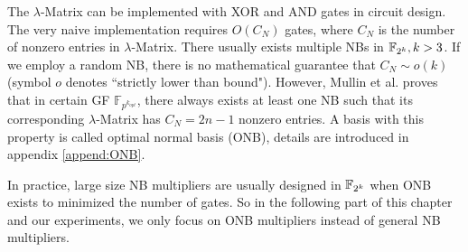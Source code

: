 The $\lambda$-Matrix can be implemented with XOR and AND gates in circuit design.
The very naive implementation requires $O(C_N)$ gates, where $C_N$ is the number of
nonzero entries in $\lambda$-Matrix.
There usually exists multiple NBs in ${\mathbb{F}}_{2^k}, k>3$. If we employ a random NB, there is no mathematical
guarantee that $C_N \sim o(k)$ (symbol $o$ denotes ``strictly lower than bound"). However,
Mullin et al. \cite{mullinONB} %
proves that in certain GF $\mathbb F_{p^{k_{opt}}}$, there always exists at least one NB such that 
its corresponding $\lambda$-Matrix has $C_N = 2n-1$ nonzero entries. A basis with this property is
called optimal normal basis (ONB), details are introduced in appendix \ref{append:ONB}.

In practice, large size NB multipliers are usually designed in ${\mathbb{F}}_{2^k}$ when ONB exists
to minimized the number of gates. So in the following part of this chapter and our experiments,
we only focus on ONB multipliers instead of general NB multipliers.


